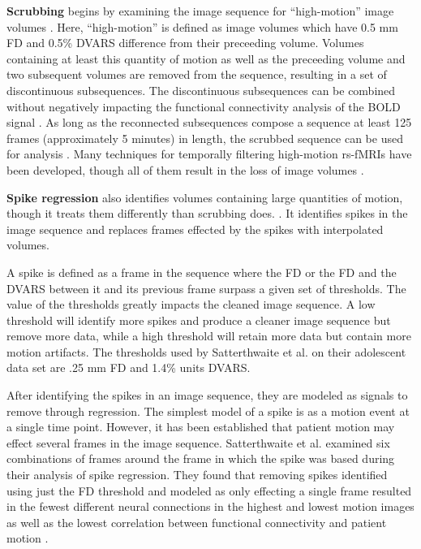 \textbf{Scrubbing} begins by examining the image sequence for ``high-motion'' image volumes \cite{Power2012}. Here, ``high-motion'' is defined as image volumes which have 0.5 mm FD and 0.5\% DVARS difference from their preceeding volume. Volumes containing at least this quantity of motion as well as the preceeding volume and two subsequent volumes are removed from the sequence, resulting in a set of discontinuous subsequences. The discontinuous subsequences can be combined without negatively impacting the functional connectivity analysis of the BOLD signal \cite{Fair2007} \cite{VanDijk2010}. As long as the reconnected subsequences compose a sequence at least 125 frames (approximately 5 minutes) in length, the scrubbed sequence can be used for analysis \cite{Power2012}. Many techniques for temporally filtering high-motion rs-fMRIs have been developed,  though all of them result in the loss of image volumes \cite{Barnes2011} \cite{Fransson2007} \cite{Jones2010} \cite{Kennedy2008} \cite{Smyser2010} \cite{Smyser2011}.  

\textbf{Spike regression} also identifies volumes containing large quantities of motion, though it treats them differently than scrubbing does. \cite{Satterthwaite2013}. It identifies spikes in the image sequence and replaces frames effected by the spikes with interpolated volumes.

A spike is defined as a frame in the sequence where the FD or the FD and the DVARS between it and its previous frame surpass a given set of thresholds. The value of the thresholds greatly impacts the cleaned image sequence. A low threshold will identify more spikes and produce a cleaner image sequence but remove more data, while a high threshold will retain more data but contain more motion artifacts. The thresholds used by Satterthwaite et al. on their adolescent data set are .25 mm FD and 1.4\% units DVARS. 

After identifying the spikes in an image sequence, they are modeled as signals to remove through regression. The simplest model of a spike is as a motion event at a single time point. However, it has been established that patient motion may effect several frames in the image sequence. Satterthwaite et al. examined six combinations of frames around the frame in which the spike was based during their analysis of spike regression. They found that removing spikes identified using just the FD threshold and modeled as only effecting a single frame resulted in the fewest different neural connections in the highest and lowest motion images as well as the lowest correlation between functional connectivity and patient motion \cite{Satterthwaite2013}.


